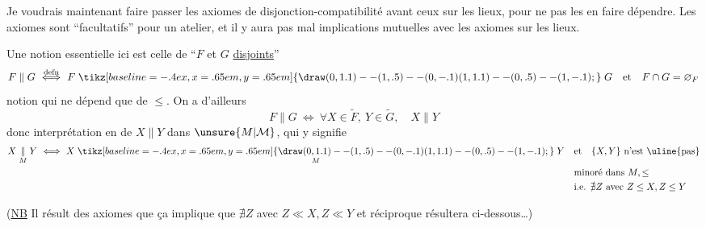 \usetikzlibrary{calc}
Je voudrais maintenant faire passer les axiomes de disjonction-compatibilité avant ceux sur les lieux, pour ne pas  les en faire dépendre. Les axiomes sont ``facultatifs'' pour un atelier, et il y aura pas mal  implications mutuelles avec les axiomes sur les lieux.

Une notion essentielle ici est celle de ``$F$ et $G$ \uline{disjoints}''
\[
 F\parallel G\ \overset{\mathrm{defn}}{\Longleftrightarrow}\ F\mathrel{\tikz[baseline=-.4ex,x=.65em,y=.65em]{\draw (0,1.1)--(1,.5)--(0,-.1) (1,1.1)--(0,.5)--(1,-.1);}}G\quad\text{et}\quad F\cap G=\varnothing_F
\]
notion qui ne dépend que de $\leq$. On a d'ailleurs
\[
 F\parallel G\ \Longleftrightarrow\ \forall X\in\widetilde F,\ Y\in\widetilde G,\quad X\parallel Y
\]
donc interprétation en  de $X\parallel Y$ dans $\unsure{M|\mathcal M}$, qui y signifie
\[
\begin{aligned}
X\mathrel{\underset{M}{\parallel}}Y\ \Longleftrightarrow\
 X\mathrel{\underset{M}{\mathrel{\tikz[baseline=-.4ex,x=.65em,y=.65em]{\draw (0,1.1)--(1,.5)--(0,-.1) (1,1.1)--(0,.5)--(1,-.1);}}}}Y\quad &\text{et}\quad\{X,Y\}\ \text{n'est \uline{pas}}\\
&\text{minoré dans } M,\leq\\
&\text{i.e. }\nexists Z\ \text{avec }Z\leq X,Z\leq Y
\end{aligned}
\]

(\uline{NB} Il résult des axiomes  que ça implique que $\nexists Z$ avec $Z\ll X,Z\ll Y$\unsure{)|,}  et  réciproque résultera  ci-dessous\ldots)

